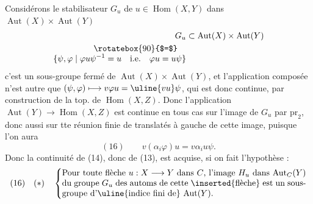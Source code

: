 Considérons  le stabilisateur 
$G_u$ de $u\in\operatorname{Hom}(X,Y)$ dans $\operatorname{Aut}(X)\times\operatorname{Aut}(Y)$
\[
\begin{aligned}
G_u&\subset\operatorname{Aut}(X)\times\operatorname{Aut}(Y)\\
\rotatebox{90}{$=$}\quad&\\[-1ex]
\{\psi,\varphi\mid\varphi u\psi^{-1}=u\quad\text{i.e.}\quad\varphi u=u\psi\}&
\end{aligned}
\]
c'est un sous-groupe fermé de $\operatorname{Aut}(X)\times\operatorname{Aut}(Y)$,
et l'application composée
n'est autre que $(\psi,\varphi)\longmapsto v\varphi u=\uline{vu}\psi$, qui est
donc continue, par construction de la top. de
$\operatorname{Hom}(X,Z)$. Donc l'application $\operatorname{Aut}(Y)\longrightarrow\operatorname{Hom}(X,Z)$
est continue en tous cas sur l'image  de $G_u$
par $\mathrm{pr}_2$,  donc aussi sur tte réunion
finie de translatés à gauche  de cette image,
puisque l'on aura 
\[
(16)\qquad v(\alpha_i\varphi)u=v\alpha_i u\psi.
\]
Donc la continuité de (14), donc de (13), est
acquise, si on fait l'hypothèse :
\[
(16)\quad(*)\quad\left\{
\begin{minipage}{0.83\linewidth}
Pour toute flèche $u:X\longrightarrow Y$ dans $C$, l'image
$H_u$ dans $\operatorname{Aut}_C(Y)$ du groupe $G_u$ des automs de cette
\inserted{flèche} est un sous-groupe d'\uline{indice fini de}
$\operatorname{Aut}(Y)$.
\end{minipage}\right.
\]

